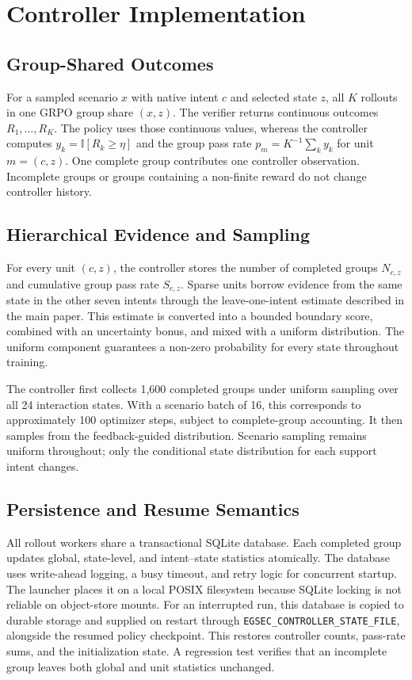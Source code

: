 \section{Controller Implementation}
\subsection{Group-Shared Outcomes}
For a sampled scenario $x$ with native intent $c$ and selected state $z$, all
$K$ rollouts in one GRPO group share $(x,z)$. The verifier returns continuous
outcomes $R_1,\ldots,R_K$. The policy uses those continuous values, whereas the
controller computes $y_k=\mathbb I[R_k\geq\eta]$ and the group pass rate
$p_m=K^{-1}\sum_k y_k$ for unit $m=(c,z)$. One complete group contributes one
controller observation. Incomplete groups or groups containing a non-finite
reward do not change controller history.

\subsection{Hierarchical Evidence and Sampling}
For every unit $(c,z)$, the controller stores the number of completed groups
$N_{c,z}$ and cumulative group pass rate $S_{c,z}$. Sparse units borrow evidence
from the same state in the other seven intents through the leave-one-intent
estimate described in the main paper. This estimate is converted into a bounded
boundary score, combined with an uncertainty bonus, and mixed with a uniform
distribution. The uniform component guarantees a non-zero probability for
every state throughout training.

The controller first collects 1,600 completed groups under uniform sampling
over all 24 interaction states. With a scenario batch of 16, this corresponds to approximately 100
optimizer steps, subject to complete-group accounting. It then samples from the
feedback-guided distribution. Scenario sampling remains uniform throughout;
only the conditional state distribution for each support intent changes.

\subsection{Persistence and Resume Semantics}
All rollout workers share a transactional SQLite database. Each completed group
updates global, state-level, and intent--state statistics atomically. The
database uses write-ahead logging, a busy timeout, and retry logic for concurrent
startup. The launcher places it on a local POSIX filesystem because SQLite
locking is not reliable on object-store mounts. For an interrupted run, this
database is copied to durable storage and supplied on restart through
\texttt{EGSEC\_CONTROLLER\_STATE\_FILE}, alongside the resumed policy checkpoint.
This restores controller counts, pass-rate sums, and the initialization state. A
regression test verifies that an incomplete group leaves both global and unit
statistics unchanged.

